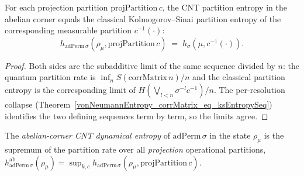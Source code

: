 \begin{theorem}\label{cntEntropyPartition_eq_ksEntropyPartition}
  \leanok
  For each projection partition \(\mathrm{projPartition}\,c\), the CNT partition entropy in the
  abelian corner equals the classical Kolmogorov--Sinai partition entropy of the corresponding
  measurable partition \(c^{-1}(\cdot)\):
  \[
    h_{\mathrm{adPerm}\,\sigma}(\rho_\mu,\mathrm{projPartition}\,c)
      \;=\; h_\sigma(\mu, c^{-1}(\cdot)) .
  \]
\end{theorem}
\begin{proof}\leanok
  Both sides are the subadditive limit of the same sequence divided by \(n\): the quantum partition
  rate is \(\inf_n S(\mathrm{corrMatrix}\,n)/n\) and the classical partition entropy is the
  corresponding limit of \(H(\bigvee_{l<n}\sigma^{-l}c^{-1})/n\). The per-resolution collapse
  (Theorem~\ref{vonNeumannEntropy_corrMatrix_eq_ksEntropySeq}) identifies the two defining sequences
  term by term, so the limits agree.
\end{proof}

\begin{definition}\label{cntDynamicalEntropyAbelian}
  \leanok
  The \emph{abelian-corner CNT dynamical entropy} of \(\mathrm{adPerm}\,\sigma\) in the state
  \(\rho_\mu\) is the supremum of the partition rate over all \emph{projection} operational
  partitions, \(h^{\mathrm{ab}}_{\mathrm{adPerm}\,\sigma}(\rho_\mu)
  =\sup_{k,c}h_{\mathrm{adPerm}\,\sigma}(\rho_\mu,\mathrm{projPartition}\,c)\).
\end{definition}

